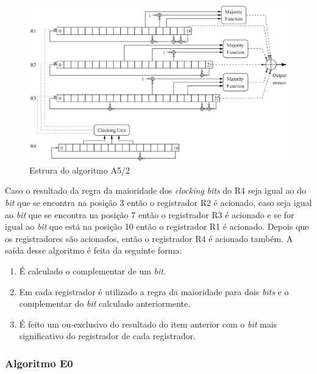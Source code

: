 \begin{figure}[h]
\centering
\includegraphics[keepaspectratio=true,scale=0.5]
    {figuras/a5_2.eps}
    \caption[Estrura do algoritmo A5/2]{Estrura do algoritmo A5/2\protect\footnotemark } 
\end{figure}

Caso o resultado da regra da maioridade dos \textit{clocking} \textit{bits} do R4 seja igual ao do \textit{bit} que se encontra na posição 3 então o registrador R2 é acionado, caso seja igual ao \textit{bit} que se encontra na posição 7 então o registrador R3 é acionado e se for igual ao \textit{bit} que está na posição 10 então o registrador R1 é acionado. Depois que os registradores são acionados, então o registrador R4 é acionado também. A saída desse algoritmo é feita da seguinte forma:

\begin{enumerate}
	\item É calculado o complementar de um \textit{bit}.
	\item Em cada registrador é utilizado a regra da maioridade para dois \textit{bits} e o complementar do \textit{bit} calculado anteriormente. 
	\item É feito um ou-exclusivo do resultado do item anterior com o \textit{bit} mais significativo do registrador de cada registrador.
\end{enumerate}

\subsubsection{Algoritmo E0}
\label{algorithm-e0}

